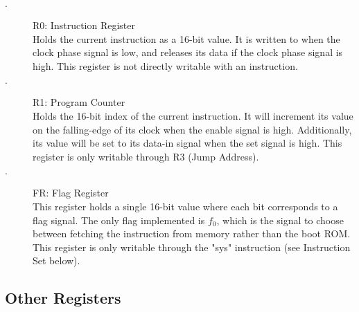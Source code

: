 \documentclass{article}
\begin{document}
		\begin{description}
			\item[$\cdot$] R0: Instruction Register\\
			Holds the current instruction as a 16-bit value. It is written to when the clock phase signal is low, and releases its data if the clock phase signal is high. This register is not directly writable with an instruction.
			\item[$\cdot$] R1: Program Counter\\
			Holds the 16-bit index of the current instruction. It will increment its value on the falling-edge of its clock when the enable signal is high. Additionally, its value will be set to its data-in signal when the set signal is high. This register is only writable through R3 (Jump Address).
			\item[$\cdot$] FR: Flag Register\\
			This register holds a single 16-bit value where each bit corresponds to a flag signal. The only flag implemented is $f_0$, which is the signal to choose between fetching the instruction from memory rather than the boot ROM. This register is only writable through the "sys" instruction (see Instruction Set below).
		\end{description}

		\subsection{Other Registers}
\end{document}
